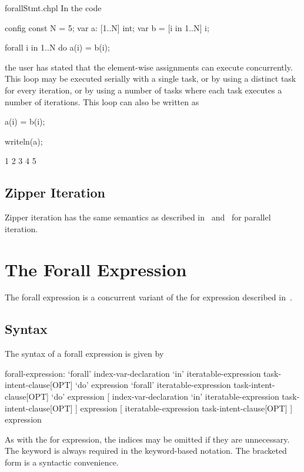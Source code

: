 \begin{chapelexample}{forallStmt.chpl}
In the code
\begin{chapelpre}
config const N = 5;
var a: [1..N] int;
var b = [i in 1..N] i;
\end{chapelpre}
\begin{chapel}
forall i in 1..N do
  a(i) = b(i);
\end{chapel}
the user has stated that the element-wise assignments can execute
concurrently.  This loop may be executed serially with a single task,
or by using a distinct task for every iteration, or by using a number
of tasks where each task executes a number of iterations.  This loop
can also be written as
\begin{chapel}
[i in 1..N] a(i) = b(i);
\end{chapel}
\begin{chapelpost}
writeln(a);
\end{chapelpost}
\begin{chapeloutput}
1 2 3 4 5
\end{chapeloutput}
\end{chapelexample}

\subsection{Zipper Iteration}
\label{forall_zipper}

Zipper iteration has the same semantics as described
in~ and~ for parallel
iteration.


\section{The Forall Expression}
\label{Forall_Expressions}

The forall expression is a concurrent variant of the for expression
described in~.

\subsection{Syntax}
\label{forall_expr_syntax}

The syntax of a forall expression is given by
\begin{syntax}
forall-expression:
  `forall' index-var-declaration `in' iteratable-expression task-intent-clause[OPT] `do' expression
  `forall' iteratable-expression task-intent-clause[OPT] `do' expression
  [ index-var-declaration `in' iteratable-expression task-intent-clause[OPT] ] expression
  [ iteratable-expression task-intent-clause[OPT] ] expression
\end{syntax}
As with the for expression, the indices may be omitted if they are
unnecessary.  The  keyword is always required in the
keyword-based notation.  The bracketed form is a syntactic
convenience.


